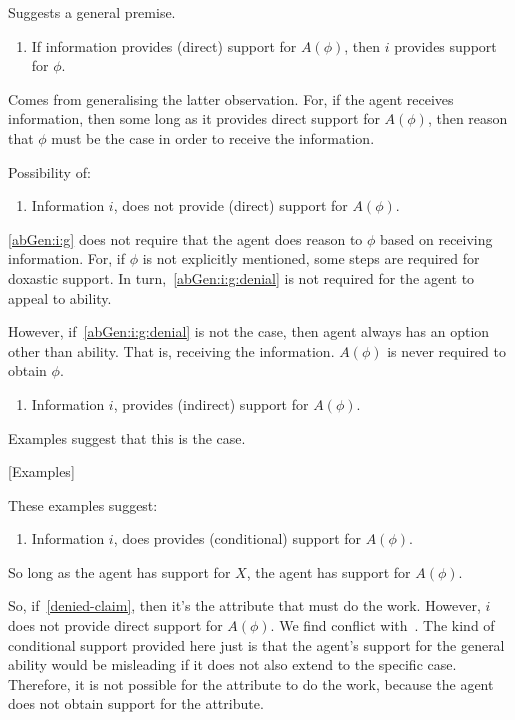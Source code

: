 Suggests a general premise.

\begin{enumerate}
\item\label{abGen:i:g} If information provides (direct) support for \(A(\phi)\), then \(i\) provides support for \(\phi\).
\end{enumerate}

Comes from generalising the latter observation.
For, if the agent receives information, then some long as it provides direct support for \(A(\phi)\), then reason that \(\phi\) must be the case in order to receive the information.

Possibility of:

\begin{enumerate}
\item\label{abGen:i:g:denial} Information \(i\), does not provide (direct) support for \(A(\phi)\).
\end{enumerate}

\ref{abGen:i:g} does not require that the agent does reason to \(\phi\) based on receiving information.
For, if \(\phi\) is not explicitly mentioned, some steps are required for doxastic support.
In turn,~\ref{abGen:i:g:denial} is not required for the agent to appeal to ability.

However, if~\ref{abGen:i:g:denial} is not the case, then agent always has an option other than ability.
That is, receiving the information.
\(A(\phi)\) is never required to obtain \(\phi\).

\begin{enumerate}
\item\label{abGen:i:indirect} Information \(i\), provides (indirect) support for \(A(\phi)\).
\end{enumerate}

Examples suggest that this is the case.

[Examples]

These examples suggest:

\begin{enumerate}
\item\label{abGen:i:conditional} Information \(i\), does provides (conditional) support for \(A(\phi)\).
\end{enumerate}

So long as the agent has support for \(X\), the agent has support for \(A(\phi)\).


So, if~\ref{denied-claim}, then it's the attribute that must do the work.
However, \(i\) does not provide direct support for \(A(\phi)\).
We find conflict with~\nI{}.
The kind of conditional support provided here just is that the agent's support for the general ability would be misleading if it does not also extend to the specific case.
Therefore, it is not possible for the attribute to do the work, because the agent does not obtain support for the attribute.

